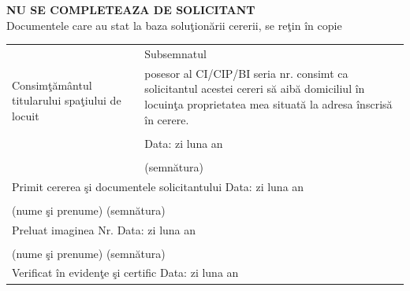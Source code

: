\documentclass[10pt,a4paper]{article}
\newcommand{\fillline}[1][6cm]{\underline{\hspace{#1}}}
\newcommand{\fillbox}[1][0.4cm]{\framebox[#1]{\rule{0pt}{#1}}}
\begin{document}
\newpage

\begin{center}
\textbf{NU SE COMPLETEAZA DE SOLICITANT}\\
\footnotesize Documentele care au stat la baza soluţionării cererii, se reţin în copie
\end{center}

\normalsize

\begin{tabularx}{\textwidth}{|m{3cm}|X|}
\hline
\multirow{5}{3cm}{Consimţământul titularului spaţiului de locuit} & Subsemnatul \fillline[10cm] \\
 & posesor al CI/CIP/BI seria \fillline[2cm] nr. \fillline[4cm] consimt ca solicitantul acestei cereri să aibă domiciliul în locuinţa proprietatea mea situată la adresa înscrisă în cerere. \\
 & \\
 & Data: \hspace{0.3cm} zi \fillbox\fillbox \hspace{0.3cm} luna \fillbox\fillbox \hspace{0.3cm} an \fillbox\fillbox\fillbox\fillbox \\
 & \hfill \fillline[5cm] \\
 & \hfill (semnătura) \\
\hline
\multicolumn{2}{|l|}{Primit cererea şi documentele solicitantului \hfill Data: \hspace{0.3cm} zi \fillbox\fillbox \hspace{0.3cm} luna \fillbox\fillbox \hspace{0.3cm} an \fillbox\fillbox\fillbox\fillbox} \\
\multicolumn{2}{|l|}{\fillline[6cm] \hfill \fillline[5cm]} \\
\multicolumn{2}{|l|}{\footnotesize (nume şi prenume) \hfill (semnătura)} \\
\hline
\multicolumn{2}{|l|}{Preluat imaginea \hspace{0.3cm} Nr. \fillline[4cm] \hfill Data: \hspace{0.3cm} zi \fillbox\fillbox \hspace{0.3cm} luna \fillbox\fillbox \hspace{0.3cm} an \fillbox\fillbox\fillbox\fillbox} \\
\multicolumn{2}{|l|}{\fillline[6cm] \hfill \fillline[5cm]} \\
\multicolumn{2}{|l|}{\footnotesize (nume şi prenume) \hfill (semnătura)} \\
\hline
\multicolumn{2}{|l|}{Verificat în evidenţe şi certific \hfill Data: \hspace{0.3cm} zi \fillbox\fillbox \hspace{0.3cm} luna \fillbox\fillbox \hspace{0.3cm} an \fillbox\fillbox\fillbox\fillbox} \\

\end{tabularx}
\end{document}

